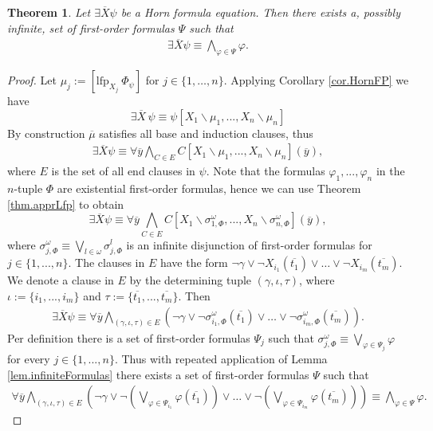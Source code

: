 \documentclass[acmsmall]{acmart}
\theoremstyle{plain}
\newtheorem{theorem}{Theorem}
\theoremstyle{definition}
\newcommand{\mybar}[1]{\overline{#1}}
\newcommand{\lfp}{\mathrm{lfp}} %
\begin{document}
\begin{theorem}\label{thm.approximation}
	Let $\exists \mybar{X} \psi$ be a Horn formula equation. Then there exists a, possibly infinite, set of first-order formulas $\Psi$ such that 
	\begin{align*}
		\exists \mybar{X} \psi \equiv \bigwedge_{\varphi \in \Psi} \varphi.
	\end{align*}	
\end{theorem}
\begin{proof}
	Let $\mu_j := [\lfp_{X_j} ~\Phi_{\psi}]$
	for $j \in \{1,\ldots,n\}$.	Applying Corollary \ref{cor.HornFP} we have 
	\[
		\exists \mybar{X}\,\psi \equiv \psi[X_1 \backslash \mu_1,...,X_n \backslash \mu_n]
	\]
	By construction $\mybar{\mu}$ satisfies all base and induction clauses, thus
	\begin{align*}
		\exists \mybar{X} \psi \equiv \forall \mybar{y} \bigwedge_{C \in E} C[X_1 \backslash \mu_1,...,X_n \backslash \mu_n](\mybar{y}),
	\end{align*}
	where $E$ is the set of all end clauses in $\psi$. Note that the formulas $\varphi_1,...,\varphi_n$ in the $n$-tuple $\Phi$ are existential first-order formulas, hence we can use Theorem \ref{thm.apprLfp} to obtain
	\[
	\exists \mybar{X} \psi \equiv \forall \mybar{y} \bigwedge_{C \in E} C[X_1 \backslash \sigma_{1,\Phi}^{\omega},...,X_n \backslash \sigma_{n,\Phi}^{\omega}](\mybar{y}),
	\]
	where $\sigma_{j,\Phi}^{\omega} \equiv \bigvee_{l\in \omega} \sigma_{j,\Phi}^l$ is an infinite disjunction of first-order formulas for $j \in \{1,...,n\}$. The clauses in $E$ have the form $\neg \gamma \vee \neg X_{i_1}(\mybar{t_1}) \vee \dots \vee \neg X_{i_m}(\mybar{t_m})$. We denote a clause in $E$ by the determining tuple $(\gamma,\iota,\tau)$, where $\iota := \{i_1,...,i_m\}$ and $\tau := \{\mybar{t_1},...,\mybar{t_m}\}$. Then 
	\begin{align*}
		\exists \mybar{X} \psi \equiv \forall \mybar{y} \bigwedge_{(\gamma,\iota,\tau) \in E} \left(\neg \gamma \vee \neg \sigma_{i_1,\Phi}^{\omega}(\mybar{t_1}) \vee \dots \vee \neg \sigma_{i_m,\Phi}^{\omega}(\mybar{t_m})\right).
	\end{align*}
	Per definition there is a set of first-order formulas $\Psi_j$ such that $\sigma_{j,\Phi}^{\omega} \equiv \bigvee_{\varphi \in \Psi_j} \varphi$ for every $j \in \{1,...,n\}$. Thus with repeated application of Lemma \ref{lem.infiniteFormulas} there exists a set of first-order formulas $\Psi$ such that 
	\begin{align*}
		\forall \mybar{y} \bigwedge_{(\gamma,\iota,\tau) \in E} \left(\neg \gamma \vee \neg (\bigvee_{\varphi \in \Psi_{i_1}} \varphi(\mybar{t_1})) \vee \dots \vee \neg (\bigvee_{\varphi \in \Psi_{i_m}} \varphi(\mybar{t_m}))\right) \equiv \bigwedge_{\varphi \in \Psi} \varphi.
	\end{align*}
\end{proof}
\end{document}
